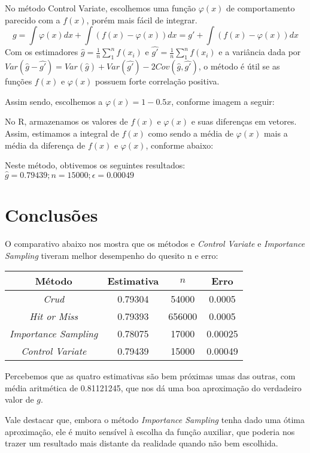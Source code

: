 \documentclass{article}
\begin{document}
No método Control Variate, escolhemos uma função $\varphi(x)$ de comportamento parecido com a $f(x)$, porém mais fácil de integrar.
$$
g = \int \varphi(x)dx + \int( f(x) - \varphi(x))dx  = g' + \int( f(x) - \varphi(x))dx
$$
Com os estimadores $\hat{g} = \frac{1}{n}\sum_{1}^{n}f(x_i)$ e $\hat{g'} = \frac{1}{n}\sum_{1}^{n}f(x_i)$ e a variância dada por $Var(\hat{g} - \hat{g'}) = Var(\hat{g})+Var(\hat{g'})-2Cov(\hat{g}, \hat{g'})$, o método é útil se as funções $f(x)$ e $\varphi(x)$ possuem forte correlação positiva.


Assim sendo, escolhemos a $\varphi(x) = 1 - 0.5x$, conforme imagem a seguir:

 


No R, armazenamos os valores de $f(x)$ e $\varphi(x)$ e suas diferenças em vetores. Assim, estimamos a integral de $f(x)$ como sendo a média de $\varphi(x)$  mais a média da diferença de $f(x)$ e $\varphi(x)$, conforme abaixo:



Neste método, obtivemos os seguintes resultados:
 $\hat{g}=0.79439; n = 15000;    \epsilon = 0.00049$

\section{Conclusões} 
 
 
O comparativo abaixo nos mostra que os métodos e \textit{Control Variate} e \textit{Importance Sampling} tiveram melhor desempenho do quesito n e erro:

\begin{center}
\begin{tabular}{ |c|c|c|c| } 
 \hline
 Método                       & Estimativa & $n$  & Erro \\ 
 \hline
 \textit{Crud}                & 0.79304 & 54000  & 0.0005 \\ 
 \textit{Hit or Miss}         & 0.79393  & 656000 & 0.0005 \\ 
 \textit{Importance Sampling} & 0.78075  & 17000  & 0.00025 \\ 
 \textit{Control Variate}     & 0.79439  & 15000  & 0.00049 \\ 
 \hline
\end{tabular}
\end{center}

Percebemos que as quatro estimativas são bem próximas umas das outras, com média aritmética de 0.81121245, que nos dá uma boa aproximação do verdadeiro valor de $g$.

Vale destacar que, embora o método \textit{Importance Sampling} tenha dado uma ótima aproximação, ele é muito sensível à escolha da função auxiliar, que poderia nos trazer um resultado mais distante da realidade quando não bem escolhida.
\end{document}
